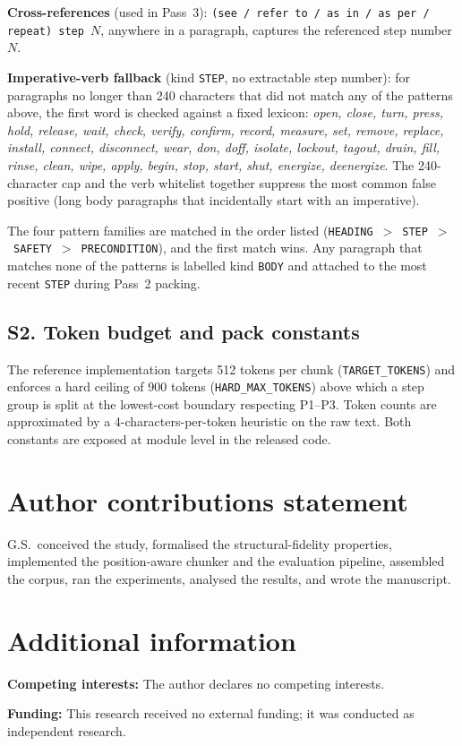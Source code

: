 \documentclass[fleqn,10pt]{wlscirep}
\begin{document}
\textbf{Cross-references} (used in Pass~3): \texttt{(see / refer to /
as in / as per / repeat) step~$N$}, anywhere in a paragraph, captures
the referenced step number $N$.

\textbf{Imperative-verb fallback} (kind \texttt{STEP}, no extractable
step number): for paragraphs no longer than 240 characters that did
not match any of the patterns above, the first word is checked against
a fixed lexicon: \emph{open, close, turn, press, hold, release, wait,
check, verify, confirm, record, measure, set, remove, replace,
install, connect, disconnect, wear, don, doff, isolate, lockout,
tagout, drain, fill, rinse, clean, wipe, apply, begin, stop, start,
shut, energize, deenergize}. The 240-character cap and the verb whitelist
together suppress the most common false positive (long body paragraphs
that incidentally start with an imperative).

The four pattern families are matched in the order listed
(\texttt{HEADING}~$>$~\texttt{STEP}~$>$~\texttt{SAFETY}~$>$~\texttt{PRECONDITION}),
and the first match wins. Any paragraph that matches none of the
patterns is labelled kind \texttt{BODY} and attached to the most
recent \texttt{STEP} during Pass~2 packing.

\subsection*{S2. Token budget and pack constants}

The reference implementation targets 512 tokens per chunk
(\texttt{TARGET\_TOKENS}) and enforces a hard ceiling of 900 tokens
(\texttt{HARD\_MAX\_TOKENS}) above which a step group is split at the
lowest-cost boundary respecting P1--P3. Token counts are approximated
by a 4-characters-per-token heuristic on the raw text. Both constants
are exposed at module level in the released code.



\section*{Author contributions statement}

G.S.\ conceived the study, formalised the structural-fidelity
properties, implemented the position-aware chunker and the evaluation
pipeline, assembled the corpus, ran the experiments, analysed the
results, and wrote the manuscript.

\section*{Additional information}

\textbf{Competing interests:} The author declares no competing interests.

\textbf{Funding:} This research received no external funding; it was
conducted as independent research.
\end{document}
